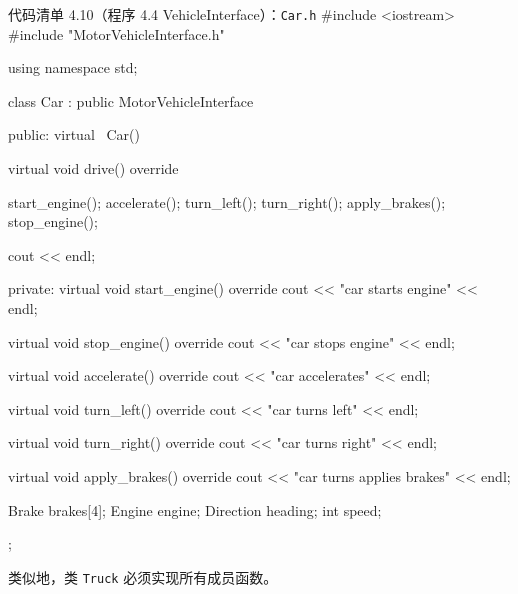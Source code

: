\begin{codeboxt}{代码清单 4.10（程序 4.4 VehicleInterface）：\texttt{Car.h}}
#include <iostream>
#include "MotorVehicleInterface.h"

using namespace std;

class Car : public MotorVehicleInterface
{
public:
    virtual ~Car() {}

    virtual void drive() override
    {
        start_engine();
        accelerate();
        turn_left();
        turn_right();
        apply_brakes();
        stop_engine();

        cout << endl;
    }

private:
    virtual void start_engine() override
    {
        cout << "car starts engine" << endl;
    }

    virtual void stop_engine() override
    {
        cout << "car stops engine" << endl;
    }

    virtual void accelerate() override
    {
        cout << "car accelerates" << endl;
    }

    virtual void turn_left() override
    {
        cout << "car turns left" << endl;
    }

    virtual void turn_right() override
    {
        cout << "car turns right" << endl;
    }

    virtual void apply_brakes() override
    {
        cout << "car turns applies brakes" << endl;
    }

    Brake brakes[4];
    Engine engine;
    Direction heading;
    int speed;
};
\end{codeboxt}

类似地，类 \texttt{Truck} 必须实现所有成员函数。


